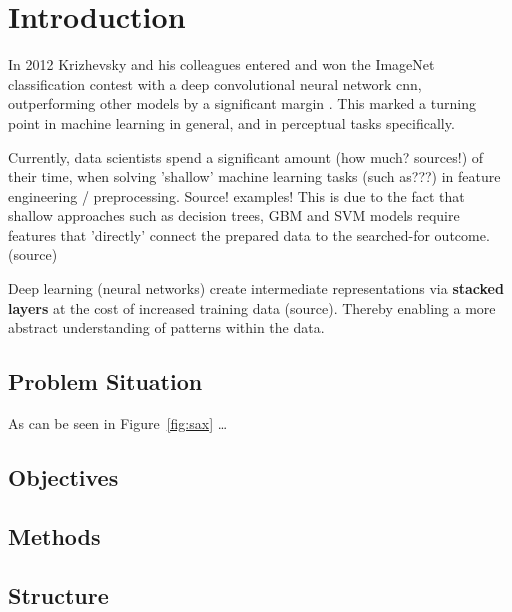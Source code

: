 \chapter{Introduction}

In 2012 Krizhevsky and his colleagues entered and won the ImageNet classification contest with a deep convolutional neural network \ac{cnn}, outperforming other models by a significant margin \cite{krizhevsky2012imagenet}. This marked a turning point in machine learning in general, and in perceptual tasks specifically. 

Currently, data scientists spend a significant amount (how much? sources!) of their time, when solving 'shallow' machine learning tasks (such as???) in feature engineering / preprocessing. Source! examples!
This is due to the fact that shallow approaches such as decision trees, GBM and SVM models require features that 'directly' connect the prepared data to the searched-for outcome. (source) 

Deep learning (neural networks) create intermediate representations via \textbf{stacked layers} at the cost of increased training data (source). Thereby enabling a more abstract understanding of patterns within the data.

\citet{Shearer2000}

\section{Problem Situation}



As can be seen in Figure~\ref{fig:sax} \ldots

\section{Objectives}


\section{Methods}


\section{Structure}

